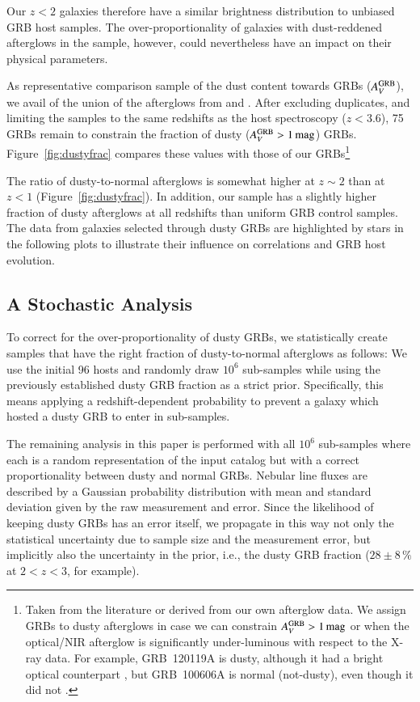 \documentclass[traditabstract, longauth]{aa}
\begin{document}
{Our $z<2$ galaxies therefore have a similar brightness distribution to unbiased GRB host samples. The over-proportionality of galaxies with dust-reddened afterglows in the sample, however, could nevertheless have an impact on their physical parameters.}

 {As representative comparison sample of the dust content towards GRBs ($A^{\rm{GRB}}_V$), we avail of the union of the afterglows from \citet{2011A&A...526A..30G} and \citet{2013MNRAS.432.1231C}. After excluding duplicates, and limiting the samples to the same redshifts as the host spectroscopy ($z<3.6$), 75 GRBs remain to constrain the fraction of dusty ($A^{\rm{GRB}}_V>1\,\rm{mag}$) GRBs.} {Figure~\ref{fig:dustyfrac} compares these values with those of our GRBs\footnote{Taken from the literature \citep{2009ApJ...693.1484C, 2011A&A...534A.108K, 2011A&A...532A.143Z, 2015arXiv150402482P} or derived from our own afterglow data. We assign GRBs to dusty afterglows in case we can constrain $A^{\rm{GRB}}_V>1\,\rm{mag}$ or when the optical/NIR afterglow is significantly under-luminous with respect to the X-ray data. For example, GRB~120119A is dusty, although it had a bright optical counterpart \citep{2014MNRAS.440.1810M}, but GRB~100606A is normal (not-dusty), even though it did not \citep{2010GCN..10835...1N}.}} 

 {The ratio of dusty-to-normal afterglows is somewhat higher at $z\sim2$ than at $z<1$ (Figure~\ref{fig:dustyfrac}). In addition, our sample has a slightly higher fraction of dusty afterglows at all redshifts than uniform GRB control samples. The data from galaxies selected through dusty GRBs are highlighted by stars in the following plots to illustrate their influence on correlations and GRB host evolution.}

\subsection{A Stochastic Analysis}
\label{sec:statana}

 {To correct for the over-proportionality of dusty GRBs, we statistically create samples that have the right fraction of dusty-to-normal afterglows as follows: We use the initial 96 hosts and randomly draw $10^6$ sub-samples while using the previously established dusty GRB fraction as a strict prior. Specifically, this means applying a redshift-dependent probability to prevent a galaxy which hosted a dusty GRB to enter in sub-samples.}
 
 {The remaining analysis in this paper is performed with all $10^{6}$ sub-samples where each is a random representation of the input catalog but with a correct proportionality between dusty and normal GRBs. Nebular line fluxes are described by a Gaussian probability distribution with mean and standard deviation given by the raw measurement and error. Since the likelihood of keeping dusty GRBs has an error itself, we propagate in this way not only the statistical uncertainty due to sample size and the measurement error, but implicitly also the uncertainty in the prior, i.e., the dusty GRB fraction ($28\pm8\,\%$ at $2<z<3$, for example).}
\end{document}
